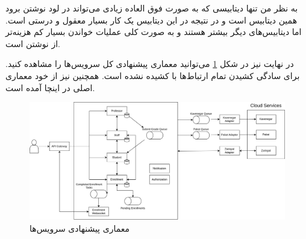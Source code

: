 به نظر من تنها دیتابیسی که به صورت فوق العاده زیادی می‌تواند در لود نوشتن برود همین دیتابیس است
و در نتیجه
در این دیتابیس یک کار بسیار معقول و درستی است. اما دیتابیس‌های دیگر بیشتر
هستند و به صورت کلی عملیات خواندن بسیار کم هزینه‌تر از نوشتن است.

در نهایت نیز در شکل
\ref{architecture}
می‌توانید معماری پیشنهادی کل سرویس‌ها را مشاهده کنید. برای سادگی کشیدن تمام ارتباط‌ها با
کشیده نشده است. همچنین
نیز از خود معماری اصلی در اینچا آمده است.
\begin{figure}
    \centering
    \includegraphics[width=\textwidth,height=\textheight,keepaspectratio]{diagrams/Architecture.png}
    \caption{معماری پیشنهادی سرویس‌ها}
    \label{architecture}
\end{figure}